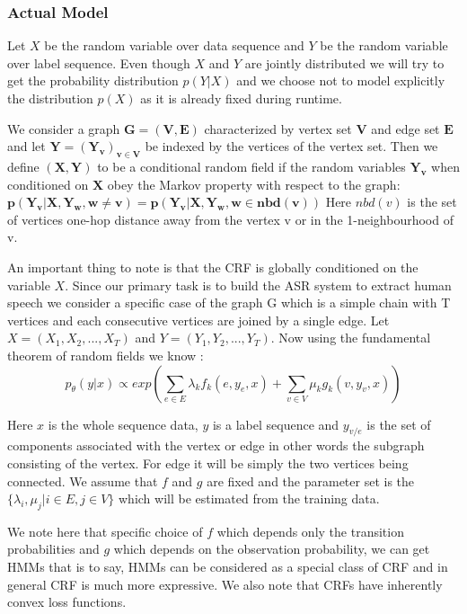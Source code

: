 \documentclass[letterpaper]{article} %
\begin{document}
\subsubsection{Actual Model}
Let $X$ be the random variable over data sequence and $Y$ be the random variable over label sequence. Even though $X$ and $Y$ are jointly distributed we will try to get the probability distribution $p(Y|X)$ and we choose not to model explicitly the distribution $p(X)$ as it is already fixed during runtime.

We consider a graph $\mathbf{G=(V,E)}$ characterized by vertex set $\mathbf{V}$ and edge set $\mathbf{E}$ and let $\mathbf{Y = (Y_v)_{v \in V}}$ be indexed by the vertices of the vertex set. Then we define $\mathbf{(X, Y)}$ to be a conditional random field if the random variables $\mathbf{Y_v}$ when conditioned on $\mathbf{X}$ obey the Markov property with respect to the graph: $\mathbf{p(Y_v | X, Y_w, w \ne v) = p(Y_v | X, Y_w, w \in nbd(v))}$ Here $nbd(v)$ is the set of vertices one-hop distance away from the vertex v or in the 1-neighbourhood of v.

An important thing to note is that the CRF is globally conditioned on the variable $X$. Since our primary task is to build the ASR system to extract human speech we consider a specific case of the graph G which is a simple chain with T vertices and each consecutive vertices are joined by a single edge. Let $X = (X_1, X_2, ... , X_T)$ and $Y = (Y_1, Y_2, ..., Y_T)$. Now using the fundamental theorem of random fields we know :
\begin{equation}
  \label{eq:1}
  p_{\theta}(y|x) \propto exp(\sum_{e \in E}\lambda_k f_k(e, y_e, x) + \sum_{v \in V}\mu_k g_k(v, y_v, x))
\end{equation}

Here $x$ is the whole sequence data, $y$ is a label  sequence and $y_{v/e}$ is the set of components associated with the vertex or edge in other words the subgraph consisting of the vertex. For edge it will be simply the two vertices being connected. We assume that $f$ and $g$ are fixed and the parameter set is the $\{\lambda_{i}, \mu_{j} |i \in E, j \in V\}$ which will be estimated from the training data.

We note here that specific choice of $f$ which depends only the transition probabilities and $g$ which depends on the observation probability, we can get HMMs that is to say, HMMs can be considered as a special class of CRF and in general CRF is much more expressive. We also note that CRFs have inherently convex loss functions.
\end{document}
